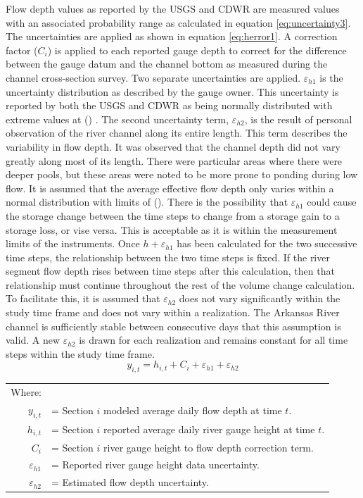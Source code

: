 \begin{linenumbers}
Flow depth values as reported by the USGS and CDWR are measured values with an associated probability range as calculated in equation \ref{eq:uncertainty3}.  The uncertainties are applied as shown in equation \ref{eq:herror1}. A correction factor ($ C_{i} $) is applied to each reported gauge depth to correct for the difference between the gauge datum and the channel bottom as measured during the channel cross-section survey.  Two separate uncertainties are applied.  $ \varepsilon_{h1} $ is the uncertainty distribution as described by the gauge owner.  This uncertainty is reported by both the USGS and CDWR as being normally distributed with extreme values at  () \parencite{USGSPL89}.  
The second uncertainty term, $ \varepsilon_{h2} $, is the result of personal observation of the river channel along its entire length.  This term describes the variability in flow depth.  
It was observed that the channel depth did not vary greatly along most of its length.  
There were particular areas where there were deeper pools, but these areas were noted to be more prone to ponding during low flow. It is assumed that the average effective flow depth only varies within a normal distribution with limits of  (). There is the possibility that $\varepsilon_{h1}$ could cause the storage change between the time steps to change from a storage gain to a storage loss, or vise versa.  This is acceptable as it is within the measurement limits of the instruments.  Once $h+\varepsilon_{h1}$ has been calculated for the two successive time steps, the relationship between the two time steps is fixed.  If the river segment flow depth rises between time steps after this calculation, then that relationship must continue throughout the rest of the volume change calculation.  To facilitate this, it is assumed that $\varepsilon_{h2}$ does not vary significantly within the study time frame and does not vary within a realization.  The Arkansas River channel is sufficiently stable between consecutive days that this assumption is valid.  A new $\varepsilon_{h2}$ is drawn for each realization and remains constant for all time steps within the study time frame.
\begin{equation}
	y_{i,t}=h_{i,t}+C_{i}+\varepsilon_{h1}+\varepsilon_{h2}
	\label{eq:herror1}
\end{equation}
\begin{tabular}{r p{5.5in}}
	Where: & \\
	$y_{i,t}$  & = Section $ i $ modeled average daily flow depth at time $ t $.\\
	$h_{i,t}$  & = Section $ i $ reported average daily river gauge height at time $ t $.\\
	$ C_{i} $ & = Section $ i $ river gauge height to flow depth correction term.\\
	$\varepsilon_{h1}$ & = Reported river gauge height data uncertainty.\\
	$\varepsilon_{h2}$ & = Estimated flow depth uncertainty.\\
\end{tabular}\\


\end{linenumbers}
